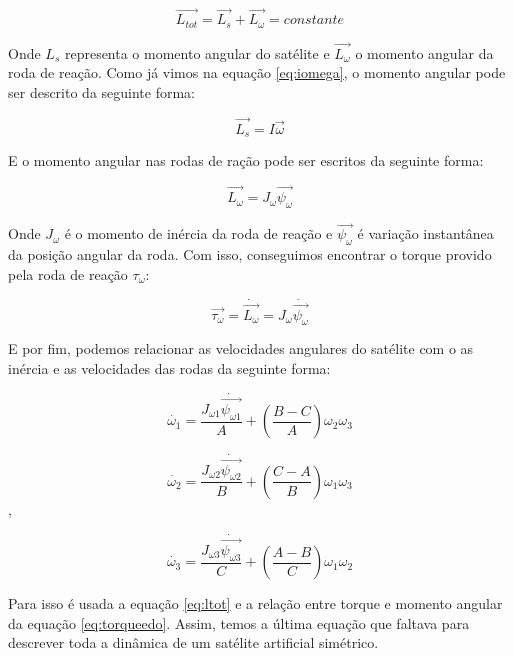 \begin{equation}\label{eq:ltot}
\vec{L_{tot}}=\vec{L_s}+\vec{L_{\omega}}=constante 
\end{equation}

Onde $L_s$ representa o momento angular do satélite e $\vec{L_{\omega}}$ o momento angular da roda de reação. Como já vimos na equação \ref{eq:iomega}, o momento angular pode ser descrito da seguinte forma:

\begin{equation}
\vec{L_s}=I\vec{\omega}
\end{equation}

E o momento angular nas rodas de ração pode ser escritos da seguinte forma:

\begin{equation}
\vec {L_{\omega} } =J_{\omega}\vec{\psi_{\omega}} 
\end{equation}

Onde $J_{\omega}$ é o momento de inércia da roda de reação e $\vec{\psi_{\omega}}$ é variação instantânea da posição angular da roda. Com isso, conseguimos encontrar o torque provido pela roda de reação $\tau_{\omega}$:

\begin{equation}\label{eq:torqueedo}
\vec{\tau_{\omega}}=\dot{\vec{L_{\omega}}}=J_{\omega}\dot{\vec{\psi_{\omega}}}
\end{equation}

E por fim, podemos relacionar as velocidades angulares do satélite com o as inércia e as velocidades das rodas da seguinte forma:

\begin{equation}\label{eq:modeloA}
  \dot{\omega_{1}}=\frac{J_{\omega 1}\dot{\vec{\psi_{\omega 1}}}}{A}+\left(\frac{B-C}{A}\right)\omega_{2}\omega_{3}
\end{equation}

\begin{equation}\label{eq:modeloB}
  \dot{\omega_{2}}=\frac{J_{\omega 2}\dot{\vec{\psi_{\omega 2}}}}{B}+\left(\frac{C-A}{B}\right)\omega_{1}\omega_{3}
\end{equation},

\begin{equation}\label{eq:modeloC}
  \dot{\omega_{3}}=\frac{J_{\omega 3}\dot{\vec{\psi_{\omega 3}}}}{C}+\left(\frac{A-B}{C}\right)\omega_{1}\omega_{2}
\end{equation}

Para isso é usada a equação \ref{eq:ltot} e a relação entre torque e momento angular da equação \ref{eq:torqueedo}. Assim, temos a última equação que faltava para descrever toda a dinâmica de um satélite artificial simétrico. 


